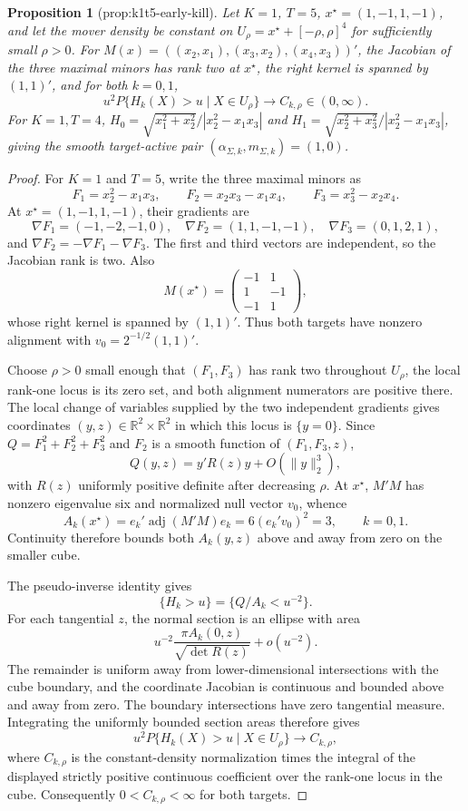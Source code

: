 \documentclass{article}
\newtheorem{proposition}{Proposition}
\begin{document}
\begin{proposition}[prop:k1t5-early-kill]\label{prop:k1t5-early-kill}
Let \(K=1\), \(T=5\), \(x^\star=(1,-1,1,-1)\), and let the mover density be constant on \(U_\rho=x^\star+[-\rho,\rho]^4\) for sufficiently small \(\rho>0\). For \(M(x)=((x_2,x_1),(x_3,x_2),(x_4,x_3))'\), the Jacobian of the three maximal minors has rank two at \(x^\star\), the right kernel is spanned by \((1,1)'\), and for both \(k=0,1\), \[u^2P\{H_k(X)>u\mid X\in U_\rho\}\longrightarrow C_{k,\rho}\in(0,\infty).\] For \(K=1,T=4\), \(H_0=\sqrt{x_1^2+x_2^2}/|x_2^2-x_1x_3|\) and \(H_1=\sqrt{x_2^2+x_3^2}/|x_2^2-x_1x_3|\), giving the smooth target-active pair \((\alpha_{\Sigma,k},m_{\Sigma,k})=(1,0)\).
\end{proposition}
\begin{proof}
For \(K=1\) and \(T=5\), write the three maximal minors as
\[
F_1=x_2^2-x_1x_3,\qquad
F_2=x_2x_3-x_1x_4,\qquad
F_3=x_3^2-x_2x_4.
\]
At \(x^\star=(1,-1,1,-1)\), their gradients are
\[
\nabla F_1=(-1,-2,-1,0),\quad
\nabla F_2=(1,1,-1,-1),\quad
\nabla F_3=(0,1,2,1),
\]
and \(\nabla F_2=-\nabla F_1-\nabla F_3\). The first and third vectors are independent, so the Jacobian rank is two. Also
\[
M(x^\star)=
\begin{pmatrix}-1&1\\1&-1\\-1&1\end{pmatrix},
\]
whose right kernel is spanned by \((1,1)'\). Thus both targets have nonzero alignment with \(v_0=2^{-1/2}(1,1)'\).

Choose \(\rho>0\) small enough that \((F_1,F_3)\) has rank two throughout \(U_\rho\), the local rank-one locus is its zero set, and both alignment numerators are positive there. The local change of variables supplied by the two independent gradients gives coordinates \((y,z)\in\mathbb R^2\times\mathbb R^2\) in which this locus is \(\{y=0\}\). Since \(Q=F_1^2+F_2^2+F_3^2\) and \(F_2\) is a smooth function of \((F_1,F_3,z)\),
\[
Q(y,z)=y'R(z)y+O(\|y\|_2^3),
\]
with \(R(z)\) uniformly positive definite after decreasing \(\rho\). At \(x^\star\), \(M'M\) has nonzero eigenvalue six and normalized null vector \(v_0\), whence
\[
A_k(x^\star)=e_k'\operatorname{adj}(M'M)e_k
=6(e_k'v_0)^2=3,
\qquad k=0,1.
\]
Continuity therefore bounds both \(A_k(y,z)\) above and away from zero on the smaller cube.

The pseudo-inverse identity gives
\[
\{H_k>u\}=\{Q/A_k<u^{-2}\}.
\]
For each tangential \(z\), the normal section is an ellipse with area
\[
u^{-2}\frac{\pi A_k(0,z)}{\sqrt{\det R(z)}}+o(u^{-2}).
\]
The remainder is uniform away from lower-dimensional intersections with the cube boundary, and the coordinate Jacobian is continuous and bounded above and away from zero. The boundary intersections have zero tangential measure. Integrating the uniformly bounded section areas therefore gives
\[
u^2P\{H_k(X)>u\mid X\in U_\rho\}
\longrightarrow C_{k,\rho},
\]
where \(C_{k,\rho}\) is the constant-density normalization times the integral of the displayed strictly positive continuous coefficient over the rank-one locus in the cube. Consequently \(0<C_{k,\rho}<\infty\) for both targets.


\end{proof}
\end{document}
